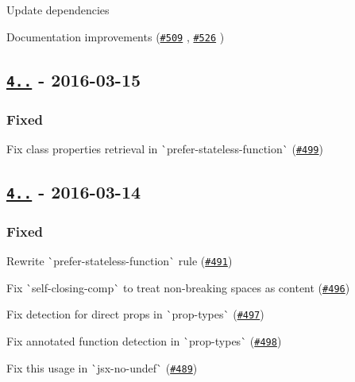 \begin{DoxyItemize}
\item Update dependencies
\item Documentation improvements (\href{https://github.com/yannickcr/eslint-plugin-react/pull/509}{\tt \#509} , \href{https://github.com/yannickcr/eslint-plugin-react/pull/526}{\tt \#526} )
\end{DoxyItemize}

\subsection*{\href{https://github.com/yannickcr/eslint-plugin-react/compare/v4.2.2...v4.2.3}{\tt 4..} -\/ 2016-\/03-\/15}

\subsubsection*{Fixed}


\begin{DoxyItemize}
\item Fix class properties retrieval in \`{}prefer-\/stateless-\/function\`{} (\href{https://github.com/yannickcr/eslint-plugin-react/issues/499}{\tt \#499})
\end{DoxyItemize}

\subsection*{\href{https://github.com/yannickcr/eslint-plugin-react/compare/v4.2.1...v4.2.2}{\tt 4..} -\/ 2016-\/03-\/14}

\subsubsection*{Fixed}


\begin{DoxyItemize}
\item Rewrite \`{}prefer-\/stateless-\/function\`{} rule (\href{https://github.com/yannickcr/eslint-plugin-react/issues/491}{\tt \#491})
\item Fix \`{}self-\/closing-\/comp\`{} to treat non-\/breaking spaces as content (\href{https://github.com/yannickcr/eslint-plugin-react/issues/496}{\tt \#496})
\item Fix detection for direct props in \`{}prop-\/types\`{} (\href{https://github.com/yannickcr/eslint-plugin-react/issues/497}{\tt \#497})
\item Fix annotated function detection in \`{}prop-\/types\`{} (\href{https://github.com/yannickcr/eslint-plugin-react/issues/498}{\tt \#498})
\item Fix {\ttfamily this} usage in \`{}jsx-\/no-\/undef\`{} (\href{https://github.com/yannickcr/eslint-plugin-react/issues/489}{\tt \#489})
\end{DoxyItemize}

